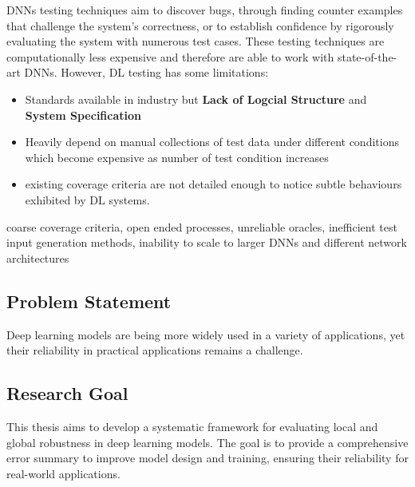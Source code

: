 DNNs testing techniques aim to discover bugs, through finding counter examples that challenge the system's correctness, or to establish confidence by rigorously evaluating the system with numerous test cases. These testing techniques are computationally less expensive and therefore are able to work with state-of-the- art DNNs. However, DL testing has some limitations:
\begin{itemize}
    \item Standards available in industry but \textbf{Lack of Logcial Structure} and \textbf{System Specification}  
     \item Heavily depend on manual collections of test data under different conditions which become expensive as number of test condition increases
     \item  existing coverage criteria are not detailed enough to notice subtle behaviours exhibited by DL systems.
\end{itemize}

coarse coverage criteria, open ended processes, unreliable
oracles, inefficient test input generation methods, inability to
scale to larger DNNs and different network architectures

\subsection{Problem Statement}

Deep learning models are being more widely used in a variety of applications, yet their reliability in practical applications remains a challenge.

\subsection{Research Goal}
This thesis aims to develop a systematic framework for evaluating local and global robustness in deep learning models. 
The goal is to provide a comprehensive error summary to improve model design and training, ensuring their reliability for real-world applications.

		
		
